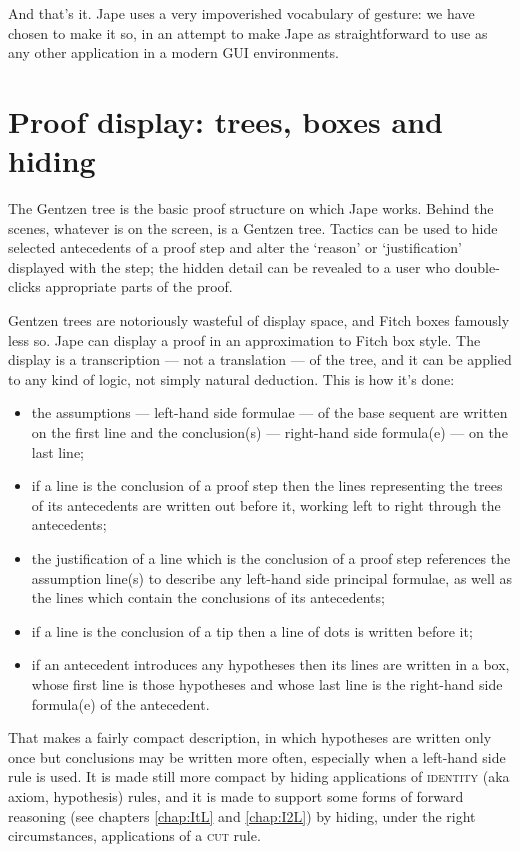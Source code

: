 And that's it. Jape uses a very impoverished vocabulary of gesture: we have chosen to make it so, in an attempt to make Jape as straightforward to use as any other application in a modern GUI environments.

\section{Proof display: trees, boxes and hiding}

The Gentzen tree is the basic proof structure on which Jape works. Behind the scenes, whatever is on the screen, is a Gentzen tree. Tactics can be used to hide selected antecedents of a proof step and alter the `reason' or `justification' displayed with the step; the hidden detail can be revealed to a user who double-clicks appropriate parts of the proof.

Gentzen trees are notoriously wasteful of display space, and Fitch boxes famously less so. Jape can display a proof in an approximation to Fitch box style. The display is a transcription --- not a translation --- of the tree, and it can be applied to any kind of logic, not simply natural deduction. This is how it's done:
\begin{itemize}
\item the assumptions --- left-hand side formulae --- of the base sequent are written on the first line and the conclusion(s) --- right-hand side formula(e) --- on the last line;
\item if a line is the conclusion of a proof step then the lines representing the trees of its antecedents are written out before it, working left to right through the antecedents;
\item the justification of a line which is the conclusion of a proof step references the assumption line(s) to describe any left-hand side principal formulae, as well as the lines which contain the conclusions of its antecedents;
\item if a line is the conclusion of a tip then a line of dots is written before it;
\item if an antecedent introduces any hypotheses then its lines are written in a box, whose first line is those hypotheses and whose last line is the right-hand side formula(e) of the antecedent.
\end{itemize}


That makes a fairly compact description, in which hypotheses are written only once but conclusions may be written more often, especially when a left-hand side rule is used. It is made still more compact by hiding applications of \textsc{identity} (aka axiom, hypothesis) rules, and it is made to support some forms of forward reasoning (see chapters \ref{chap:ItL} and \ref{chap:I2L}) by hiding, under the right circumstances, applications of a \textsc{cut} rule.

